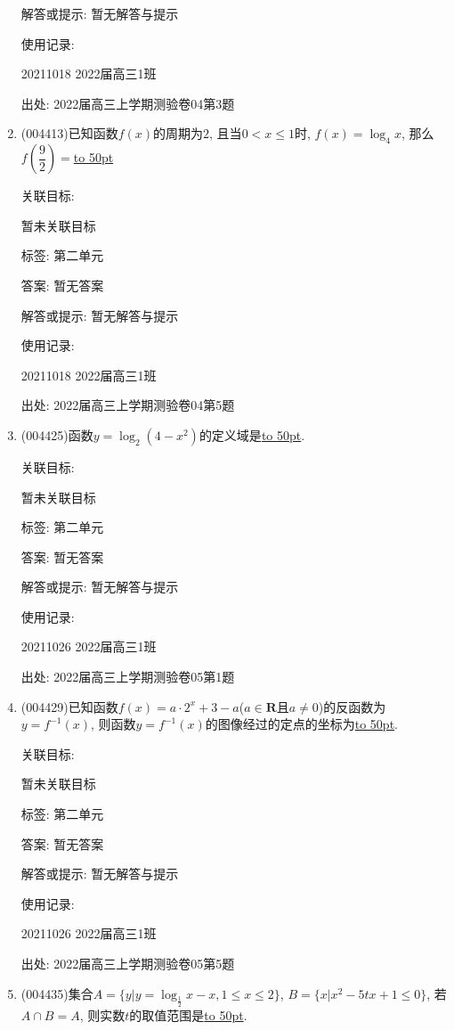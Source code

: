 \documentclass[10pt,a4paper]{article}
\newcommand{\blank}[1]{\underline{\hbox to #1pt{}}}
\begin{document}
\begin{enumerate}[1.]
解答或提示: 暂无解答与提示

使用记录:

20211018	2022届高三1班	


出处: 2022届高三上学期测验卷04第3题
\item { (004413)}已知函数$f(x)$的周期为$2$, 且当$0<x\le 1$时, $f(x)=\log_4x$, 那么$f(\dfrac 92)=$\blank{50}


关联目标:

暂未关联目标



标签: 第二单元

答案: 暂无答案

解答或提示: 暂无解答与提示

使用记录:

20211018	2022届高三1班	


出处: 2022届高三上学期测验卷04第5题
\item { (004425)}函数$y=\log_2(4-x^2)$的定义域是\blank{50}.


关联目标:

暂未关联目标



标签: 第二单元

答案: 暂无答案

解答或提示: 暂无解答与提示

使用记录:

20211026	2022届高三1班	


出处: 2022届高三上学期测验卷05第1题
\item { (004429)}已知函数$f(x)=a\cdot 2^x+3-a$($a\in \mathbf{R}$且$a\ne 0$)的反函数为$y=f^{-1}(x)$, 则函数$y=f^{-1}(x)$的图像经过的定点的坐标为\blank{50}.


关联目标:

暂未关联目标



标签: 第二单元

答案: 暂无答案

解答或提示: 暂无解答与提示

使用记录:

20211026	2022届高三1班	


出处: 2022届高三上学期测验卷05第5题
\item { (004435)}集合$A=\{y|y=\log_{\frac 12}x-x,1\le x\le 2\}$, $B=\{x|x^2-5tx+1\le 0\}$, 若$A\cap B=A$, 则实数$t$的取值范围是\blank{50}.



\end{enumerate}
\end{document}
